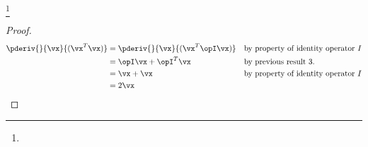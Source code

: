 \begin{corollary}
\footnote{
  }
\label{cor:mc_xAx}
\end{corollary}
\begin{proof}
\begin{align*}
  \pderiv{}{\vx}{(\vx ^T\vx )} 
    &= \pderiv{}{\vx}{(\vx ^T \opI \vx )} 
    && \text{by property of identity operator $I$}
  \\&= \opI\vx  + \opI^T\vx  
    && \text{by previous result 3.}
  \\&= \vx  + \vx  
    && \text{by property of identity operator $I$}
  \\&= 2\vx 
\end{align*}
\end{proof}




